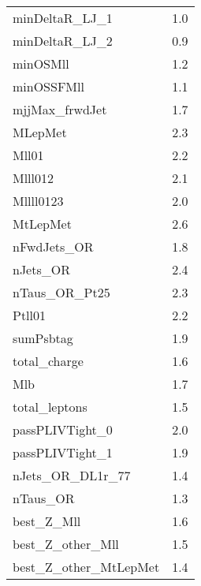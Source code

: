 \begin{longtable}{ll}
    minDeltaR\_LJ\_1             & 1.0                          \\
    minDeltaR\_LJ\_2             & 0.9                          \\
    minOSMll                     & 1.2                          \\
    minOSSFMll                   & 1.1                          \\
    mjjMax\_frwdJet              & 1.7                          \\
    MLepMet                      & 2.3                          \\
    Mll01                        & 2.2                          \\
    Mlll012                      & 2.1                          \\
    Mllll0123                    & 2.0                          \\
    MtLepMet                     & 2.6                          \\
    nFwdJets\_OR                 & 1.8                          \\
    nJets\_OR                    & 2.4                          \\
    nTaus\_OR\_Pt25              & 2.3                          \\
    Ptll01                       & 2.2                          \\
    sumPsbtag                    & 1.9                          \\
    total\_charge                & 1.6                          \\
    Mlb                          & 1.7                          \\
    total\_leptons               & 1.5                          \\
    passPLIVTight\_0             & 2.0                          \\
    passPLIVTight\_1             & 1.9                          \\
    nJets\_OR\_DL1r\_77          & 1.4                          \\
    nTaus\_OR                    & 1.3                          \\
    best\_Z\_Mll                 & 1.6                          \\
    best\_Z\_other\_Mll          & 1.5                          \\
    best\_Z\_other\_MtLepMet     & 1.4                          \\

\end{longtable}
